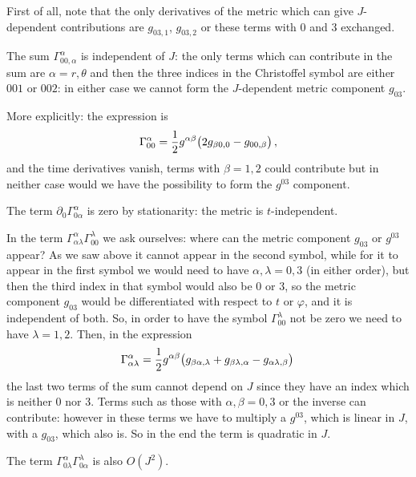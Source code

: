 \documentclass[main.tex]{subfiles}
\begin{document}
First of all, note that the only derivatives of the metric which can give \(J\)-dependent contributions are \(g_{03,1}\), \(g_{03, 2}\) or these terms with \(0\) and \(3\) exchanged. 

The sum \(\Gamma^{\alpha }_{00, \alpha } \) is independent of \(J\): the only terms which can contribute in the sum are \(\alpha = r, \theta \) and then the three indices in the Christoffel symbol are either \(001\) or \(002\): in either case we cannot form the \(J\)-dependent metric component \(g_{03}\).

More explicitly: the expression is 
%
\begin{align}
  \Gamma^{\alpha }_{00} = \frac{1}{2} g^{\alpha \beta } \qty(2g_{\beta 0,0}- g_{00, \beta } )
\,,
\end{align}
%
and the time derivatives vanish, terms with \(\beta = 1, 2\) could contribute but in neither case would we have the possibility to form the \(g^{03}\) component. 

The term \(\partial_{0} \Gamma^{\alpha }_{0\alpha }\) is zero by stationarity: the metric is \(t\)-independent. 

In the term \(\Gamma^{\alpha }_{\alpha \lambda } \Gamma^{\lambda }_{00}\) we ask ourselves: where can the metric component \(g_{03}\) or \(g^{03}\) appear? As we saw above it cannot appear in the second symbol, while for it to appear in the first symbol we would need to have \(\alpha, \lambda = 0, 3\) (in either order), but then the third index in that symbol would also be \(0\) or \(3\), so the metric component \(g_{03}\) would be differentiated with respect to \(t\) or \(\varphi \), and it is independent of both. So, in order to have the symbol \(\Gamma^{\lambda }_{00} \) not be zero we need to have \(\lambda = 1, 2\). 
Then, in the expression 
%
\begin{align}
  \Gamma^{\alpha }_{\alpha \lambda }  = \frac{1}{2}
  g^{\alpha \beta } \qty(g_{\beta \alpha , \lambda }
  + g_{\beta \lambda , \alpha }
  - g_{ \alpha \lambda , \beta })
\,
\end{align}
%
the last two terms of the sum cannot depend on \(J\) since they have an index which is neither 0 nor 3. 
Terms such as those with \(\alpha , \beta = 0,3\) or the inverse can contribute: however in these terms we have to multiply a \(g^{03}\), which is linear in \(J\), with a \(g_{03}\), which also is. So in the end the term is quadratic in \(J\). 

The term \(\Gamma^{\alpha }_{0 \lambda } \Gamma^{\lambda}_{0 \alpha }\) is also \(O(J^2)\). 
\end{document}
